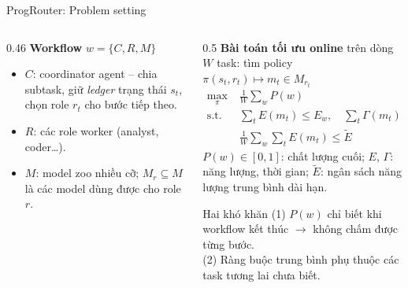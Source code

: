 \documentclass[aspectratio=169,10pt]{beamer}
\begin{document}
\begin{frame}{ProgRouter: Problem setting}
  \small
  \begin{columns}[T]
    \begin{column}{0.46\textwidth}
      \textbf{Workflow} $w = \{C, R, M\}$
      \begin{itemize}
        \item $C$: coordinator agent -- chia subtask, giữ \emph{ledger} trạng thái $s_t$,
          chọn role $r_t$ cho bước tiếp theo.
        \item $R$: các role worker (analyst, coder…).
        \item $M$: model zoo nhiều cỡ; $M_r \subseteq M$ là các model dùng được cho role $r$.
      \end{itemize}
    \end{column}
    \begin{column}{0.5\textwidth}
      \textbf{Bài toán tối ưu online} trên dòng $W$ task:
      tìm policy $\pi(s_t, r_t) \mapsto m_t \in M_{r_t}$
      \begin{align*}
        \max_\pi\;& \tfrac{1}{W}\textstyle\sum_{w} P(w) \\
        \text{s.t.}\;& \textstyle\sum_{t} E(m_t) \le E_w,\quad
                       \sum_{t} \Gamma(m_t) \le \Gamma_w \quad \forall w \\
        & \tfrac{1}{W}\textstyle\sum_{w}\sum_{t} E(m_t) \le \tilde E
      \end{align*}
      {\footnotesize $P(w)\in[0,1]$: chất lượng cuối; $E$, $\Gamma$: năng lượng, thời gian;
      $\tilde E$: ngân sách năng lượng trung bình dài hạn.}
      \begin{alertblock}{Hai khó khăn}
        (1) $P(w)$ chỉ biết khi workflow kết thúc $\to$ không chấm được từng bước.\\
        (2) Ràng buộc trung bình phụ thuộc các task tương lai chưa biết.
      \end{alertblock}
    \end{column}
  \end{columns}
\end{frame}
\end{document}
